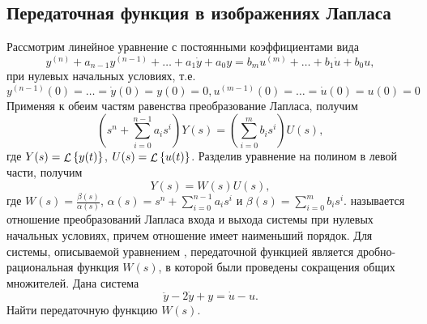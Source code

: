 \documentclass[../../TAU.tex]{subfiles}
\begin{document}
\subsection{Передаточная функция в изображениях Лапласа} %
    Рассмотрим линейное уравнение с постоянными коэффициентами вида
    \begin{equation}\label{EQ_ODU}
    y^{(n)} + a_{n-1}y^{(n-1)} + \ldots + a_1 \dot y + a_0y = b_m u^{(m)} + \ldots + b_1 \dot u + b_0 u,
    \end{equation}
    при нулевых начальных условиях, т.е. 
    $y^{(n-1)} (0) = \ldots = \dot y(0) = y(0) = 0, u^{(m-1)} (0) = \ldots = \dot u(0) = u(0) = 0$
    Применяя к обеим частям равенства преобразование Лапласа, получим
    \begin{equation}\label{EQ_W}
    \left(s^n + \sum_{i=0}^{n-1}a_is^i\right) Y(s) = \left(\sum_{i=0}^{m}b_is^i\right) U(s),
    \end{equation}
    где $Y(s) = \mathop{\mathcal{L}}\nolimits\left\{y(t)\right\}$, $U(s) = \mathop{\mathcal{L}}\nolimits\left\{u(t)\right\}$. Разделив уравнение  на полином в левой части, получим
    \begin{equation}  
        Y(s) = W(s)U(s),
    \end{equation}
    где 
    $W(s) = \frac{\beta(s)}{\alpha(s)}$, 
    $\alpha(s) = s^n + \sum_{i=0}^{n-1}a_is^i$ и 
    $\beta(s) = \sum_{i=0}^{m}b_is^i$.
     называется отношение преобразований Лапласа входа и выхода системы при нулевых начальных условиях, причем отношение имеет наименьший порядок.
    Для системы, описываемой уравнением , передаточной функцией является дробно-рациональная функция $W(s)$, в которой были проведены сокращения общих множителей.
    \examp Дана система
    $$
        \ddot y - 2\dot y + y = \dot u - u.
    $$
    Найти передаточную функцию $W(s)$.
\end{document}
